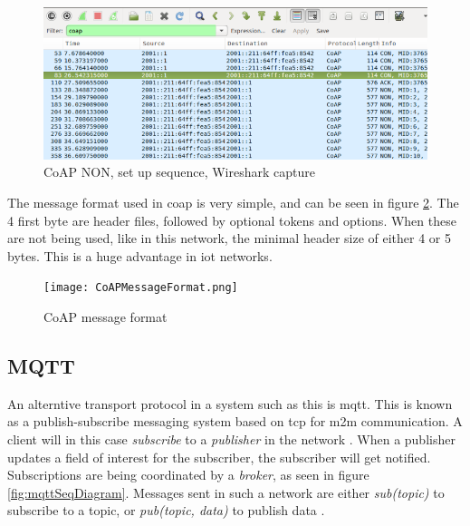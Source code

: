 \begin{figure}[ht]
    \centering
    \includegraphics[width=1.0\textwidth]{coapCONwiresharksetUpSequence.png}    
    \caption{CoAP NON, set up sequence, Wireshark capture}
    \label{fig:CoAPNONwiresharkSetUp}
\end{figure}


The message format used in \gls{coap} is very simple, and can be seen in figure \ref{fig:CoAPMessageFormat}. The 4 first byte are header files, followed by optional tokens and options. When these are not being used, like in this network, the minimal header size of either 4 or 5 bytes. This is a huge advantage in \gls{iot} networks.


\begin{figure}[ht]
    \centering
    \texttt{[image: CoAPMessageFormat.png]}    
    \caption{CoAP message format}
    \label{fig:CoAPMessageFormat}
\end{figure}






\subsection{MQTT}

An alterntive transport protocol in a system such as this is \gls{mqtt}. This is  known as a publish-subscribe messaging system based on \gls{tcp} for \gls{m2m} communication. A client will in this case \textit{subscribe} to a \textit{publisher} in the network \cite{hunkeler2008mqtt}. When a publisher updates a field of interest for the subscriber, the subscriber will get notified. Subscriptions are being coordinated by a \textit{broker}, as seen in figure \ref{fig:mqttSeqDiagram}. Messages sent in such a network are either \textit{sub(topic)} to subscribe to a topic, or \textit{pub(topic, data)} to publish data \cite{mqttWebsite}. 


